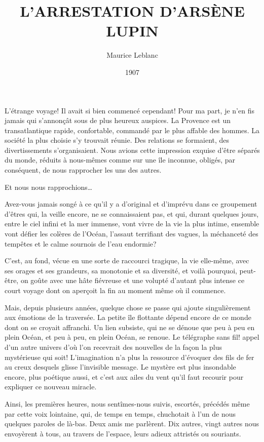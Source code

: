 \documentclass[12pt,a4paper]{article}
\begin{document}
\title{L’ARRESTATION D’ARSÈNE LUPIN}
\author{Maurice Leblanc}
\date{1907}

\maketitle


L’étrange voyage! Il avait si bien commencé cependant! Pour ma part, je n’en fis jamais qui s’annonçât sous de plus heureux auspices. La Provence est un transatlantique rapide, confortable, commandé par le plus affable des hommes. La société la plus choisie s’y trouvait réunie. Des relations se formaient, des divertissements s’organisaient. Nous avions cette impression exquise d’être séparés du monde, réduits à nous-mêmes comme sur une île inconnue, obligés, par conséquent, de nous rapprocher les uns des autres.

Et nous nous rapprochions…

Avez-vous jamais songé à ce qu’il y a d’original et d’imprévu dans ce groupement d’êtres qui, la veille encore, ne se connaissaient pas, et qui, durant quelques jours, entre le ciel infini et la mer immense, vont vivre de la vie la plus intime, ensemble vont défier les colères de l’Océan, l’assaut terrifiant des vagues, la méchanceté des tempêtes et le calme sournois de l’eau endormie?

C’est, au fond, vécue en une sorte de raccourci tragique, la vie elle-même, avec ses orages et ses grandeurs, sa monotonie et sa diversité, et voilà pourquoi, peut-être, on goûte avec une hâte fiévreuse et une volupté d’autant plus intense ce court voyage dont on aperçoit la fin au moment même où il commence.

Mais, depuis plusieurs années, quelque chose se passe qui ajoute singulièrement aux émotions de la traversée. La petite île flottante dépend encore de ce monde dont on se croyait affranchi. Un lien subsiste, qui ne se dénoue que peu à peu en plein Océan, et peu à peu, en plein Océan, se renoue. Le télégraphe sans fil! appel d’un autre univers d’où l’on recevrait des nouvelles de la façon la plus mystérieuse qui soit! L’imagination n’a plus la ressource d’évoquer des fils de fer au creux desquels glisse l’invisible message. Le mystère est plus insondable encore, plus poétique aussi, et c’est aux ailes du vent qu’il faut recourir pour expliquer ce nouveau miracle.

Ainsi, les premières heures, nous sentîmes-nous suivis, escortés, précédés même par cette voix lointaine, qui, de temps en temps, chuchotait à l’un de nous quelques paroles de là-bas. Deux amis me parlèrent. Dix autres, vingt autres nous envoyèrent à tous, au travers de l’espace, leurs adieux attristés ou souriants.
\end{document}
